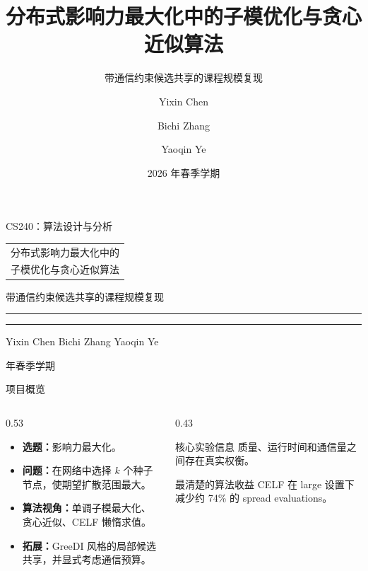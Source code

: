 \documentclass[UTF8, 10pt, aspectratio=169]{ctexbeamer}
\title[分布式影响力最大化]{分布式影响力最大化中的子模优化与贪心近似算法}
\subtitle{带通信约束候选共享的课程规模复现}
\author{Yixin Chen \and Bichi Zhang \and Yaoqin Ye}
\institute{CS240：算法设计与分析}
\date{2026 年春季学期}
\newcommand{\metricbox}[2]{%
    \begin{block}{#1}
        \centering\Large #2
    \end{block}
}
\begin{document}
\begingroup
{}
\begin{frame}[plain]
    \vspace{0.72cm}
    {\color{deepteal}\large CS240：算法设计与分析}

    \vspace{0.44cm}
    \begingroup
    \color{ink}\sffamily\bfseries\fontsize{25}{33}\selectfont
    \begin{tabular}{@{}l@{}}
    分布式影响力最大化中的\\
    子模优化与贪心近似算法
    \end{tabular}
    \endgroup

    \vspace{0.34cm}
    {\color{deepteal}\rmfamily\large 带通信约束候选共享的课程规模复现\par}

    \vspace{0.52cm}
    {\color{amber}\rule{0.18\linewidth}{1.4pt}\hspace{0.16cm}
    \color{deepteal}\rule{0.54\linewidth}{1.4pt}}

    \vfill
    {\color{ink}\rmfamily\large Yixin Chen \quad Bichi Zhang \quad Yaoqin Ye}

    \vspace{0.16cm}
    {\color{deepteal} 年春季学期}
\end{frame}
\endgroup

\begin{frame}{项目概览}
    \begin{columns}[T,onlytextwidth]
        \begin{column}{0.53\linewidth}
            \begin{itemize}
                \item \textbf{选题：}影响力最大化。
                \item \textbf{问题：}在网络中选择 $k$ 个种子节点，使期望扩散范围最大。
                \item \textbf{算法视角：}单调子模最大化、贪心近似、CELF 懒惰求值。
                \item \textbf{拓展：}GreeDI 风格的局部候选共享，并显式考虑通信预算。
            \end{itemize}
        \end{column}
        \begin{column}{0.43\linewidth}
            \metricbox{核心实验信息}{质量、运行时间和通信量之间存在真实权衡。}
            \metricbox{最清楚的算法收益}{CELF 在 large 设置下减少约 74\% 的 spread evaluations。}
        \end{column}
    \end{columns}
\end{frame}
\end{document}
